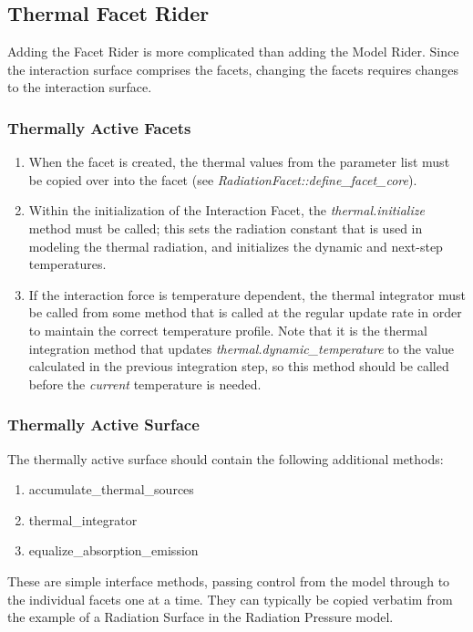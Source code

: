 \subsection{Thermal Facet Rider}
Adding the Facet Rider is more complicated than adding the Model Rider.  Since the interaction surface comprises the facets, changing the facets requires changes to the interaction surface.

\subsubsection{Thermally Active Facets}
\begin{enumerate}
\item
When the facet is created, the thermal values from the parameter list must be copied over into the facet (see \textit{RadiationFacet::define\_facet\_core}).
\item
Within the initialization of the Interaction Facet, the \textit{thermal.initialize} method must be called; this sets the radiation constant that is used in modeling the thermal radiation, and initializes the dynamic and next-step temperatures.
\item
If the interaction force is temperature dependent, the thermal integrator must be called from some method that is called at the regular update rate in order to maintain the correct temperature profile.  Note that it is the thermal integration method that updates \textit{thermal.dynamic\_temperature} to the value calculated in the previous integration step, so this method should be called before the \textit{current} temperature is needed.
\end{enumerate}

\subsubsection{Thermally Active Surface}
The thermally active surface should contain the following additional methods:
\begin{enumerate}
\item{accumulate\_thermal\_sources}
\item{thermal\_integrator}
\item{equalize\_absorption\_emission}
\end{enumerate}
These are simple interface methods, passing control from the model through to the individual facets one at a time.  They can typically be copied verbatim from the example of a Radiation Surface in the Radiation Pressure model.



